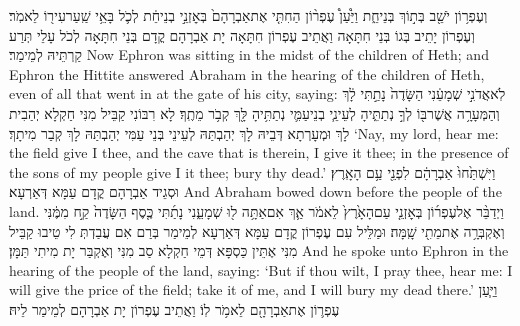 {וְעֶפְר֥וֹן יֹשֵׁ֖ב בְּת֣וֹךְ בְּנֵי\maqqaf חֵ֑ת וַיַּ֩עַן֩ עֶפְר֨וֹן הַחִתִּ֤י אֶת\maqqaf אַבְרָהָם֙ בְּאׇזְנֵ֣י בְנֵי\maqqaf חֵ֔ת לְכֹ֛ל בָּאֵ֥י שַֽׁעַר\maqqaf עִיר֖וֹ לֵאמֹֽר׃}
{וְעֶפְרוֹן יָתֵיב בְּגוֹ בְּנֵי חִתָּאָה וַאֲתֵיב עֶפְרוֹן חִתָּאָה יָת אַבְרָהָם קֳדָם בְּנֵי חִתָּאָה לְכֹל עָלֵי תְּרַע קַרְתֵּיהּ לְמֵימַר׃}
{Now Ephron was sitting in the midst of the children of Heth; and Ephron the Hittite answered Abraham in the hearing of the children of Heth, even of all that went in at the gate of his city, saying:}{}
{לֹֽא\maqqaf אֲדֹנִ֣י שְׁמָעֵ֔נִי הַשָּׂדֶה֙ נָתַ֣תִּי לָ֔ךְ וְהַמְּעָרָ֥ה אֲשֶׁר\maqqaf בּ֖וֹ לְךָ֣ נְתַתִּ֑יהָ לְעֵינֵ֧י בְנֵי\maqqaf עַמִּ֛י נְתַתִּ֥יהָ לָּ֖ךְ קְבֹ֥ר מֵתֶֽךָ׃}
{לָא רִבּוֹנִי קַבֵּיל מִנִּי חַקְלָא יְהַבִית לָךְ וּמְעָרְתָא דְּבֵיהּ לָךְ יְהַבְתַּהּ לְעֵינֵי בְּנֵי עַמִּי יְהַבְתַּהּ לָךְ קְבַר מִיתָךְ׃}
{‘Nay, my lord, hear me: the field give I thee, and the cave that is therein, I give it thee; in the presence of the sons of my people give I it thee; bury thy dead.’}{}
{וַיִּשְׁתַּ֙חוּ֙ אַבְרָהָ֔ם לִפְנֵ֖י עַ֥ם הָאָֽרֶץ׃}
{וּסְגֵיד אַבְרָהָם קֳדָם עַמָּא דְּאַרְעָא׃}
{And Abraham bowed down before the people of the land.}{}
{וַיְדַבֵּ֨ר אֶל\maqqaf עֶפְר֜וֹן בְּאׇזְנֵ֤י עַם\maqqaf הָאָ֙רֶץ֙ לֵאמֹ֔ר אַ֛ךְ אִם\maqqaf אַתָּ֥ה ל֖וּ שְׁמָעֵ֑נִי נָתַ֜תִּי כֶּ֤סֶף הַשָּׂדֶה֙ קַ֣ח מִמֶּ֔נִּי וְאֶקְבְּרָ֥ה אֶת\maqqaf מֵתִ֖י שָֽׁמָּה׃}
{וּמַלֵּיל עִם עֶפְרוֹן קֳדָם עַמָּא דְּאַרְעָא לְמֵימַר בְּרַם אִם עֲבַדְתְּ לִי טֵיבוּ קַבֵּיל מִנִּי אֶתֵּין כַּסְפָּא דְּמֵי חַקְלָא סַב מִנִּי וְאֶקְבַּר יָת מִיתִי תַּמָּן׃}
{And he spoke unto Ephron in the hearing of the people of the land, saying: ‘But if thou wilt, I pray thee, hear me: I will give the price of the field; take it of me, and I will bury my dead there.’}{}
{וַיַּ֧עַן עֶפְר֛וֹן אֶת\maqqaf אַבְרָהָ֖ם לֵאמֹ֥ר לֽוֹ׃}
{וַאֲתֵיב עֶפְרוֹן יָת אַבְרָהָם לְמֵימַר לֵיהּ׃}
